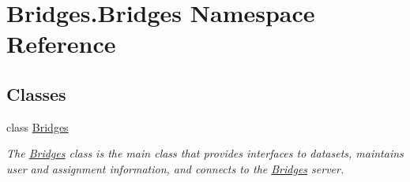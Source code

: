 \hypertarget{namespace_bridges_1_1_bridges}{}\section{Bridges.\+Bridges Namespace Reference}
\label{namespace_bridges_1_1_bridges}
\subsection*{Classes}
\begin{DoxyCompactItemize}
\item 
class \mbox{\hyperlink{class_bridges_1_1_bridges_1_1_bridges}{Bridges}}
\begin{DoxyCompactList}\small\item\em The \mbox{\hyperlink{class_bridges_1_1_bridges_1_1_bridges}{Bridges}} class is the main class that provides interfaces to datasets, maintains user and assignment information, and connects to the \mbox{\hyperlink{class_bridges_1_1_bridges_1_1_bridges}{Bridges}} server. \end{DoxyCompactList}\end{DoxyCompactItemize}
